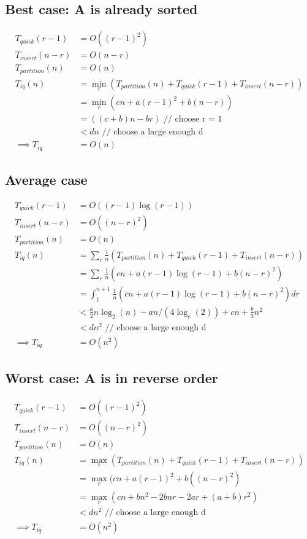 \documentclass{article}
\begin{document}
\subsection{Best case: A is already sorted}
\begin{align*}
T_{quick}(r-1) &= O((r-1)^2)\\
T_{insert}(n-r) &= O(n-r)\\
T_{partition}(n) &= O(n)\\
T_{iq}(n)
&= \min_r (T_{partition}(n) + T_{quick}(r-1) + T_{insert}(n-r))\\
&= \min_r(cn + a(r-1)^2 + b(n-r))\\
&= ((c+b)n -br) \text{ // choose r = 1}\\
&< dn \text{ // choose a large enough d}\\
\implies T_{iq} &= O(n)
\end{align*}

\subsection{Average case}
\begin{align*}
T_{quick}(r-1) &= O((r-1) \log (r-1))\\
T_{insert}(n-r) &= O((n-r)^2)\\
T_{partition}(n) &= O(n)\\
T_{iq}(n)
&= \sum_r \frac{1}{n}(T_{partition}(n) + T_{quick}(r-1) + T_{insert}(n-r))\\
&= \sum_r \frac{1}{n}(cn + a (r-1) \log (r-1) + b(n-r)^2)\\
&= \int_1^{n+1} \frac{1}{n}(cn + a (r-1) \log (r-1) + b(n-r)^2) d r\\
&< \frac{a}{2} n \log_2(n) - a n/(4\log_e(2)) + cn + \frac{b}{3} n^2 \\
&< dn^2 \text{ // choose a large enough d}\\
\implies T_{iq} &= O(n^2)
\end{align*}

\subsection{Worst case: A is in reverse order}
\begin{align*}
T_{quick}(r-1) &= O((r-1)^2)\\
T_{insert}(n-r) &= O((n-r)^2)\\
T_{partition}(n) &= O(n)\\
T_{iq}(n)
&= \max_r (T_{partition}(n) + T_{quick}(r-1) + T_{insert}(n-r))\\
&= \max_r(cn + a(r-1)^2 + b((n-r)^2)\\
&= \max_r (cn + bn^2 -2bnr -2ar + (a+b)r^2)\\
&< dn^2 \text{ // choose a large enough d}\\
\implies T_{iq} &= O(n^2)
\end{align*}
\end{document}

